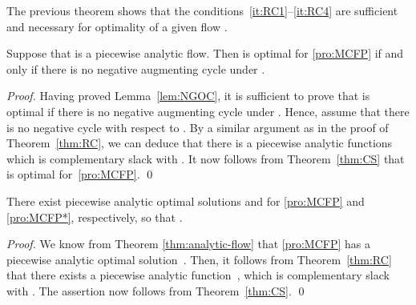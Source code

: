 \documentclass{svjour3}                     \smartqed
\begin{document}
The previous theorem shows that the conditions~\ref{it:RC1}--\ref{it:RC4} are sufficient and necessary for optimality of a given flow .



\begin{theorem}
\label{thm:NCOC}
Suppose that  is a piecewise analytic flow. Then  is optimal for \eqref{pro:MCFP} if and only if there is no negative augmenting cycle under .
\end{theorem}
\begin{proof}
Having proved Lemma~\ref{lem:NGOC}, it is sufficient to prove that  is optimal if there is no negative augmenting cycle under . Hence, assume that there is no negative cycle with respect to . By a similar argument as in the proof of Theorem~\ref{thm:RC}, we can deduce that there is a piecewise analytic functions  which is complementary slack with . It now follows from Theorem~\ref{thm:CS} that~ is optimal for~\eqref{pro:MCFP}.
\qed
\end{proof}

\begin{theorem}
\label{StrongDuality1}
There exist piecewise analytic optimal solutions  and  for \eqref{pro:MCFP} and \eqref{pro:MCFP*}, respectively, so that .
\end{theorem}
\begin{proof}
We know from Theorem \ref{thm:analytic-flow} that \eqref{pro:MCFP} has a piecewise analytic optimal solution~. Then, it follows from Theorem~\ref{thm:RC} that there exists a piecewise analytic function~, which is complementary slack with . The assertion now follows from Theorem~\ref{thm:CS}.
\qed
\end{proof}
\end{document}
